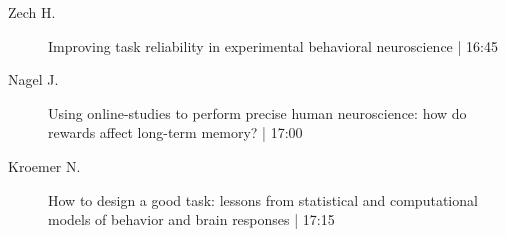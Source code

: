 \begin{symposium}
\begin{description}
                \item [ Zech H.] Improving task reliability in experimental behavioral neuroscience \textcolor{mygray}{ | 16:45}    
                
                \item [ Nagel J.] Using online-studies to perform precise human neuroscience: how do rewards affect long-term memory? \textcolor{mygray}{ | 17:00}    
                
                \item [ Kroemer N.] How to design a good task: lessons from statistical and computational models of behavior and brain responses \textcolor{mygray}{ | 17:15}    
                
            \end{description} 
            \end{symposium}
            
